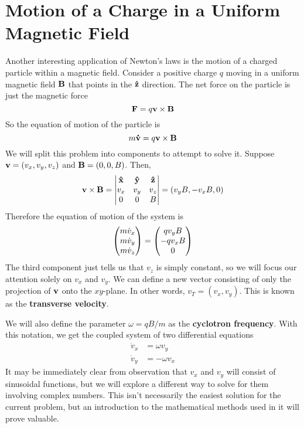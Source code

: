 \section{Motion of a Charge in a Uniform Magnetic Field}
Another interesting application of Newton's laws is the motion of a charged particle within a magnetic field. Consider a positive charge $q$ moving in a uniform magnetic field $\mathbf{B}$ that points in the $\mathbf{\hat{z}}$ direction. The net force on the particle is just the magnetic force
\[ \mathbf{F} = q\mathbf{v}\times\mathbf{B} \]
So the equation of motion of the particle is
\[ m\mathbf{\dot v} = q\mathbf{v}\times\mathbf{B} \]
We will split this problem into components to attempt to solve it. Suppose $\mathbf{v} = (v_x, v_y, v_z)$ and $\mathbf{B} = (0,0,B)$. Then,
\[ \mathbf{v}\times\mathbf{B} = \begin{vmatrix}\mathbf{\hat{x}} & \mathbf{\hat{y}} & \mathbf{\hat{z}} \\ v_x & v_y & v_z \\ 0 & 0 & B \end{vmatrix} = (v_yB, -v_xB, 0) \]
Therefore the equation of motion of the system is
\[ \begin{pmatrix}m\dot v_x \\ m\dot v_y \\ m\dot v_z\end{pmatrix} = \begin{pmatrix}qv_yB \\ -qv_xB \\ 0 \end{pmatrix}\]
The third component just tells us that $v_z$ is simply constant, so we will focus our attention solely on $v_x$ and $v_y$. We can define a new vector consisting of only the projection of $\mathbf{v}$ onto the $xy$-plane. In other words, $v_T = (v_x, v_y)$. This is known as the \textbf{transverse velocity}.

We will also define the parameter $\omega = qB/m$ as the \textbf{cyclotron frequency}. With this notation, we get the coupled system of two differential equations
\begin{align*}
    \dot v_x &= \omega v_y \\
    \dot v_y &= -\omega v_x 
\end{align*}
It may be immediately clear from observation that $v_x$ and $v_y$ will consist of sinusoidal functions, but we will explore a different way to solve for them involving complex numbers. This isn't necessarily the easiest solution for the current problem, but an introduction to the mathematical methods used in it will prove valuable.

